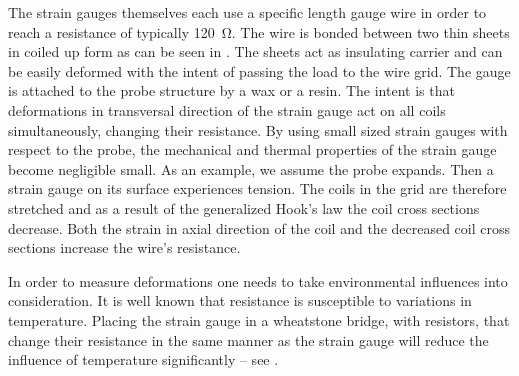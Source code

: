 The strain gauges themselves each use a specific length gauge wire in order to reach a resistance of typically \SI{120}{\ohm}. The wire is bonded between two thin sheets in coiled up form as can be seen in . The sheets act as insulating carrier and can be easily deformed with the intent of passing the load to the wire grid. The gauge is attached to the probe structure by a wax or a resin. The intent is that deformations in transversal direction of the strain gauge act on all coils simultaneously, changing their resistance. By using small sized strain gauges with respect to the probe, the mechanical and thermal properties of the strain gauge become negligible small. As an example, we assume the probe expands. Then a strain gauge on its surface experiences tension. The coils in the grid are therefore stretched and as a result of the generalized Hook's law the coil cross sections decrease. Both the strain in axial direction of the coil and the decreased coil cross sections increase the wire's resistance.

In order to measure deformations one needs to take environmental influences into consideration. It is well known that resistance is susceptible to variations in temperature. Placing the strain gauge in a wheatstone bridge, with resistors, that change their resistance in the same manner as the strain gauge will reduce the influence of temperature significantly -- see .

